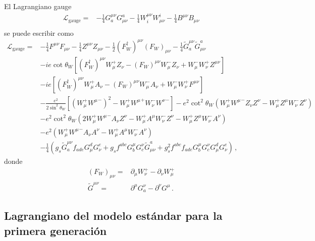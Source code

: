 \begin{frame}
El Lagrangiano gauge
\begin{align}
  \mathcal{L}_{\text{gauge}}=& -\tfrac{1}{4}G^{\mu\nu}_a G_{\mu\nu}^a-\tfrac{1}{4}W^{\mu\nu}_i W_{\mu\nu}^i-\tfrac{1}{4}B^{\mu\nu} B_{\mu\nu}\nonumber\\
\end{align}
se puede escribir como
\begin{align}
\label{eq:lgaguefin}
\mathcal{L}_{\text{gauge}}=&  -\tfrac{1}{4}F^{\mu\nu} F_{\mu\nu}-\tfrac{1}{4}Z^{\mu\nu} Z_{\mu\nu}-\tfrac{1}{2}(F_W^\dagger)^{\mu\nu} (F_W)_{\mu\nu}
- \tfrac{1}{4}\widetilde{G}^{\mu\nu}_a \widetilde{G}_{\mu\nu}^a\nonumber\\
&-ie\cot\theta_W\left[(F_W^\dagger)^{\mu\nu}W_\mu^+ Z_\nu-(F_W)^{\mu\nu}W_\mu^- Z_\nu+W_\mu^-W_\nu^+Z^{\mu\nu}\right]\nonumber\\
&-ie\left[(F_W^\dagger)^{\mu\nu}W_\mu^+ A_\nu-(F_W)^{\mu\nu}W_\mu^- A_\nu+W_\mu^-W_\nu^+F^{\mu\nu}\right]\nonumber\\
&-\frac{e^2}{2\sin^2\theta_W}\left[\left(W_\mu^+{W^\mu}^-\right)^2-W_\mu^+{W^\mu}^+W_\nu^-{W^\nu}^-\right]
-e^2\cot^2\theta_W\left(W_\mu^+{W^\mu}^-Z_\nu Z^\nu-W_\mu^+Z^\mu W_\nu^-Z^\nu\right)\nonumber\\
&-e^2\cot^2\theta_W\left(2W_\mu^+{W^\mu}^-A_\nu Z^\nu-W_\mu^+A^\mu W_\nu^-Z^\nu-W_\mu^+Z^\mu W_\nu^-A^\nu\right)\nonumber\\
&-e^2\left(W_\mu^+{W^\mu}^-A_\nu A^\nu-W_\mu^+A^\mu W_\nu^-A^\nu\right)\nonumber\\
&- \frac{1}{4}\left(g_s\widetilde{G}^{\mu\nu}_af_{a d e}G^d_\mu G^e_\nu
    +g_sf^{a b c}G_b^\mu G_c^\nu\widetilde{G}_{\mu\nu}^a
    +g_s^2f^{a b c}f_{a d e}G_b^\mu G_c^\nu G^d_\mu G^e_\nu\right)\,,
\end{align}
donde
\begin{align}
  (F_W)_{\mu\nu}=&\partial_\mu W^+_\nu-\partial_\nu W^+_\mu\nonumber\\
  \widetilde{G}^{\mu\nu}=&\partial^\mu G^\nu_a-\partial^\nu G^\mu\,.
\end{align}

\end{frame}
\subsection{Lagrangiano del modelo estándar para la primera generación}

